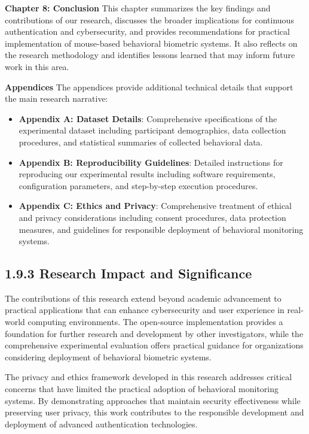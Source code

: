 \documentclass[
  12pt,
  a4paper,
]{report}
\begin{document}
\textbf{Chapter 8: Conclusion} This chapter summarizes the key findings
and contributions of our research, discusses the broader implications
for continuous authentication and cybersecurity, and provides
recommendations for practical implementation of mouse-based behavioral
biometric systems. It also reflects on the research methodology and
identifies lessons learned that may inform future work in this area.

\textbf{Appendices} The appendices provide additional technical details
that support the main research narrative:

\begin{itemize}
\item
  \textbf{Appendix A: Dataset Details}: Comprehensive specifications of
  the experimental dataset including participant demographics, data
  collection procedures, and statistical summaries of collected
  behavioral data.
\item
  \textbf{Appendix B: Reproducibility Guidelines}: Detailed instructions
  for reproducing our experimental results including software
  requirements, configuration parameters, and step-by-step execution
  procedures.
\item
  \textbf{Appendix C: Ethics and Privacy}: Comprehensive treatment of
  ethical and privacy considerations including consent procedures, data
  protection measures, and guidelines for responsible deployment of
  behavioral monitoring systems.
\end{itemize}

\subsection{1.9.3 Research Impact and
Significance}\label{research-impact-and-significance}

The contributions of this research extend beyond academic advancement to
practical applications that can enhance cybersecurity and user
experience in real-world computing environments. The open-source
implementation provides a foundation for further research and
development by other investigators, while the comprehensive experimental
evaluation offers practical guidance for organizations considering
deployment of behavioral biometric systems.

The privacy and ethics framework developed in this research addresses
critical concerns that have limited the practical adoption of behavioral
monitoring systems. By demonstrating approaches that maintain security
effectiveness while preserving user privacy, this work contributes to
the responsible development and deployment of advanced authentication
technologies.
\end{document}
